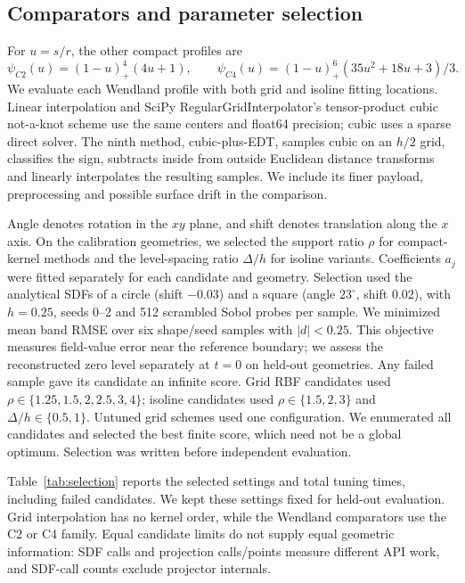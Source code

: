 \documentclass[12pt,letterpaper]{article}
\begin{document}
\subsection{Comparators and parameter selection}
For $u=s/r$, the other compact profiles are
\begin{equation}
  \psi_{C2}(u)=(1-u)_+^4(4u+1),\qquad
  \psi_{C4}(u)=(1-u)_+^6(35u^2+18u+3)/3.
\end{equation}
We evaluate each Wendland profile with both grid and isoline fitting locations. Linear interpolation and SciPy RegularGridInterpolator's tensor-product cubic not-a-knot scheme use the same centers and float64 precision; cubic uses a sparse direct solver. The ninth method, cubic-plus-EDT, samples cubic on an $h/2$ grid, classifies the sign, subtracts inside from outside Euclidean distance transforms and linearly interpolates the resulting samples. We include its finer payload, preprocessing and possible surface drift in the comparison.

Angle denotes rotation in the $xy$ plane, and shift denotes translation along the $x$ axis. On the calibration geometries, we selected the support ratio $\rho$ for compact-kernel methods and the level-spacing ratio $\Delta/h$ for isoline variants. Coefficients $a_j$ were fitted separately for each candidate and geometry. Selection used the analytical SDFs of a circle (shift $-0.03$) and a square (angle $23^\circ$, shift $0.02$), with $h=0.25$, seeds 0--2 and 512 scrambled Sobol probes per sample. We minimized mean band RMSE over six shape/seed samples with $|d|<0.25$. This objective measures field-value error near the reference boundary; we assess the reconstructed zero level separately at $t=0$ on held-out geometries. Any failed sample gave its candidate an infinite score. Grid RBF candidates used $\rho\in\{1.25,1.5,2,2.5,3,4\}$; isoline candidates used $\rho\in\{1.5,2,3\}$ and $\Delta/h\in\{0.5,1\}$. Untuned grid schemes used one configuration. We enumerated all candidates and selected the best finite score, which need not be a global optimum. Selection was written before independent evaluation.

Table~\ref{tab:selection} reports the selected settings and total tuning times, including failed candidates. We kept these settings fixed for held-out evaluation. Grid interpolation has no kernel order, while the Wendland comparators use the C2 or C4 family. Equal candidate limits do not supply equal geometric information: SDF calls and projection calls/points measure different API work, and SDF-call counts exclude projector internals.
\begin{table}[htbp]\centering\small\caption{Selected method settings and recorded tuning costs. Level spacing is inapplicable to grid fitting; radius is inapplicable to grid interpolation.}\label{tab:selection}\end{table}
\end{document}
